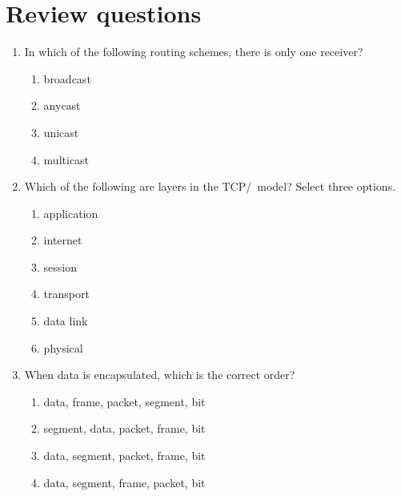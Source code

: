 \section{Review questions}
\begin{enumerate}
\item
   In which of the following routing schemes, there is only one receiver?
   \begin{multicols}{2}
   \begin{enumerate}
   \item broadcast
   \item anycast
   \item unicast
   \item multicast
   \end{enumerate}
   \end{multicols}
\item
   Which of the following are layers in the \acs{TCP}/\IP\ model?
   Select three options.
   \begin{multicols}{2}
   \begin{enumerate}
   \item application
   \item internet
   \item session
   \item transport
   \item data link
   \item physical
   \end{enumerate}
   \end{multicols}
\item
   When data is encapsulated, which is the correct order?
   \begin{enumerate}
   \item data, frame, packet, segment, bit
   \item segment, data, packet, frame, bit
   \item data, segment, packet, frame, bit
   \item data, segment, frame, packet, bit
   \end{enumerate}
\end{enumerate}